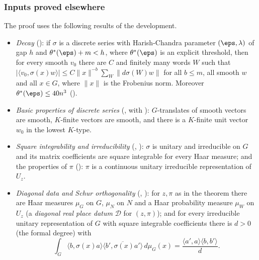 \subsubsection{Inputs proved elsewhere}
The proof uses the following results of the development.
\begin{itemize}
\item \emph{Decay} (): if $\sigma$ is a discrete
series with Harish-Chandra parameter $(\eps,\lambda)$ of gap $h$ and $\theta^*(\eps)+m<h$, where $\theta^*(\eps)$ is
an explicit threshold, then for every smooth $v_0$ there are $C$ and finitely many words $W$ such that
$|\langle v_0,\sigma(x)w\rangle|\le C\|x\|^{-b}\sum_W\|d\sigma(W)w\|$ for all $b\le m$, all smooth $w$ and all
$x\in G$, where $\|x\|$ is the Frobenius norm. Moreover $\theta^*(\eps)\le40n^3$
().
\item \emph{Basic properties of discrete series}
(, with
): $G$-translates of smooth vectors are smooth,
$K$-finite vectors are smooth, and there is a $K$-finite unit vector $w_0$ in the lowest $K$-type.
\item \emph{Square integrability and irreducibility}
(,
): $\sigma$ is unitary and irreducible on
$G$ and its matrix coefficients are square integrable for every Haar measure; and the properties of $\pi$
(): $\pi$ is a continuous unitary irreducible
representation of $U_z$.
\item \emph{Diagonal data and Schur orthogonality}
(,
): for $z,\pi$ as in the theorem there are Haar
measures $\mu_G$ on $G$, $\mu_N$ on $N$ and a Haar probability measure $\mu_W$ on $U_z$ (a \emph{diagonal real
place datum} $\mathcal D$ for $(z,\pi)$); and for every irreducible unitary representation of $G$ with square
integrable coefficients there is $d>0$ (the formal degree) with
\begin{equation}\label{eq:pf:sh-local:schur}
\int_G\langle b,\sigma(x)a\rangle\overline{\langle b',\sigma(x)a'\rangle}\,d\mu_G(x)=\frac{\langle a',a\rangle\langle b,b'\rangle}d .
\end{equation}

\end{itemize}

